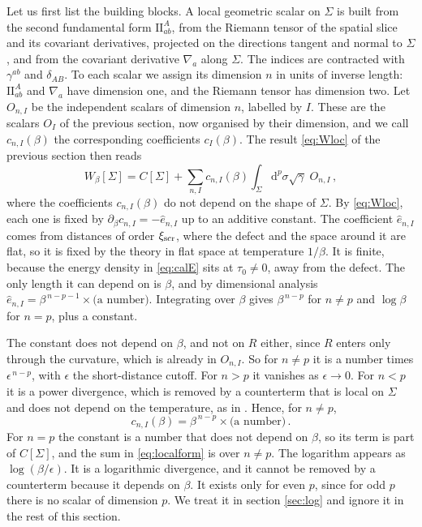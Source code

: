 \documentclass[a4paper,11pt]{article}
\newcommand{\II}{\mathrm{I\!I}}
\newcommand{\xiscr}{\xi_{\rm scr}}
\newcommand{\dd}{\mathrm{d}}
\begin{document}
Let us first list the building blocks. A local geometric scalar on $\Sigma$ is built from the second fundamental form $\II^A_{ab}$, from the Riemann tensor of the spatial slice and its covariant derivatives, projected on the directions tangent and normal to $\Sigma$, and from the covariant derivative $\nabla_a$ along $\Sigma$. The indices are contracted with $\gamma^{ab}$ and $\delta_{AB}$. To each scalar we assign its dimension $n$ in units of inverse length: $\II^A_{ab}$ and $\nabla_a$ have dimension one, and the Riemann tensor has dimension two. Let $O_{n,I}$ be the independent scalars of dimension $n$, labelled by $I$. These are the scalars $O_I$ of the previous section, now organised by their dimension, and we call $c_{n,I}(\beta)$ the corresponding coefficients $c_I(\beta)$. The result \eqref{eq:Wloc} of the previous section then reads
\begin{equation}\label{eq:localform}
	W_\beta[\Sigma]= C[\Sigma]+\sum_{n,I}c_{n,I}(\beta)\int_\Sigma\dd^p\sigma\sqrt\gamma\;O_{n,I}\, ,
\end{equation}
where the coefficients $c_{n,I}(\beta)$ do not depend on the shape of $\Sigma$.
By \eqref{eq:Wloc}, each one is fixed by $\partial_\beta c_{n,I}=-\hat e_{n,I}$ up to an additive constant. The coefficient $\hat e_{n,I}$ comes from distances of order $\xiscr$, where the defect and the space around it are flat, so it is fixed by the theory in flat space at temperature $1/\beta$. It is finite, because the energy density in \eqref{eq:calE} sits at $\tau_0\neq0$, away from the defect. The only length it can depend on is $\beta$, and by dimensional analysis $\hat e_{n,I}=\beta^{\,n-p-1}\times\text{(a number)}$. Integrating over $\beta$ gives $\beta^{\,n-p}$ for $n\neq p$ and $\log\beta$ for $n=p$, plus a constant.
	
	The constant does not depend on $\beta$, and not on $R$ either, since $R$ enters only through the curvature, which is already in $O_{n,I}$. So for $n\neq p$ it is a number times $\epsilon^{\,n-p}$, with $\epsilon$ the short-distance cutoff. For $n>p$ it vanishes as $\epsilon\to0$. For $n<p$ it is a power divergence, which is removed by a counterterm that is local on $\Sigma$ and does not depend on the temperature, as in \cite{BMP}. Hence, for $n\neq p$,
	\begin{equation}\label{eq:cscaling}
		c_{n,I}(\beta)=\beta^{\,n-p}\times\text{(a number)}\, .
	\end{equation}
	For $n=p$ the constant is a number that does not depend on $\beta$, so its term is part of $C[\Sigma]$, and the sum in \eqref{eq:localform} is over $n\neq p$. The logarithm appears as $\log(\beta/\epsilon)$. It is a logarithmic divergence, and it cannot be removed by a counterterm because it depends on $\beta$. It exists only for even $p$, since for odd $p$ there is no scalar of dimension $p$. We treat it in section \ref{sec:log} and ignore it in the rest of this section.
\end{document}
